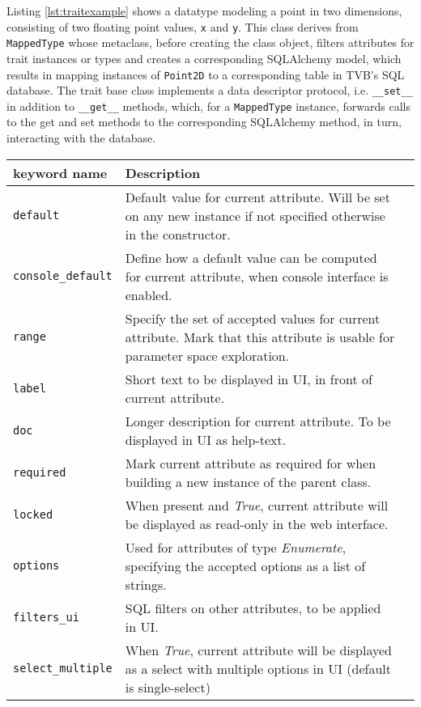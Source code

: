 \documentclass{bioinfo}
\begin{document}
Listing \ref{lst:traitexample} shows a datatype modeling a point in two 
dimensions, consisting of two floating point values, \texttt{x} and 
\texttt{y}. This class derives from \texttt{MappedType} whose metaclass, 
before creating the class object, filters attributes for trait instances 
or types and creates a corresponding SQLAlchemy model, which results 
in mapping instances of \texttt{Point2D} to a corresponding table in TVB's
SQL database. The trait base class implements a data descriptor protocol,
i.e. \texttt{\_\_set\_\_} in addition to \texttt{\_\_get\_\_} methods, which, for a
\texttt{MappedType} instance, forwards calls to the get and set methods to 
the corresponding SQLAlchemy method, in turn, interacting with the database.

\begin{center}
	\begin{table*}[ht]
		\begin{tabularx}{\textwidth}{lll}
			\toprule
			keyword name & Description  \\
			\midrule
			\texttt{default}          & Default value for current attribute. Will be set on any new instance if not specified otherwise in the constructor.  \\
			\texttt{console\_default} & Define how a default value can be computed for current attribute, when console interface is enabled. \\
			\texttt{range}            & Specify the set of accepted values for current attribute. Mark that this attribute is usable for parameter space exploration. \\
			\texttt{label}            & Short text to be displayed in UI, in front of current attribute. \\
			\texttt{doc}              & Longer description for current attribute. To be displayed in UI as help-text. \\
			\texttt{required}         & Mark current attribute as required for when building a new instance of the parent class. \\
			\texttt{locked}           & When present and \emph{True}, current attribute will be displayed as read-only in the web interface. \\
			\texttt{options}          & Used for attributes of type \emph{Enumerate}, specifying the accepted options as a list of strings. \\
			\texttt{filters\_ui}      & SQL filters on other attributes, to be applied in UI. \\
			\texttt{select\_multiple} & When \emph{True}, current attribute will be displayed as a select with multiple options in UI (default is single-select) \\

\end{tabularx}
\end{table*}
\end{center}
\end{document}
